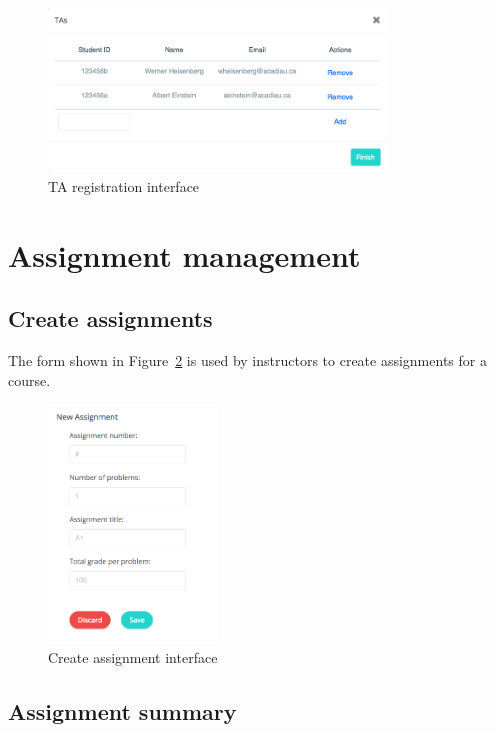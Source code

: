 \begin{figure}[H]
    \centering
        \includegraphics[width=0.8\textwidth]{figures/reg-ta}
    \caption{TA registration interface}
    \label{fig:REG_TA}
\end{figure}


\section{Assignment management}

\subsection{Create assignments}
The form shown in Figure~\ref{fig:NEW_ASM} is used by instructors to create
assignments for a course.

\begin{figure}[H]
    \centering
        \includegraphics[width=0.4\textwidth]{figures/create-asm}
    \caption{Create assignment interface}
    \label{fig:NEW_ASM}
\end{figure}

\subsection{Assignment summary}

